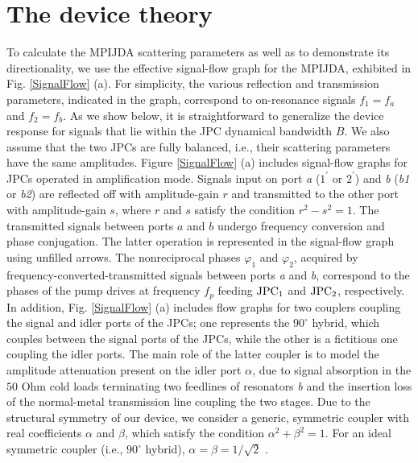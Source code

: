 \documentclass[aip,onecolumn,10pt]{revtex4}%
\begin{document}
\section{The device theory}
To calculate the MPIJDA scattering parameters as well as to demonstrate its directionality, we use the effective signal-flow graph for the MPIJDA, exhibited in Fig. \ref{SignalFlow} (a). For simplicity, the various reflection and transmission parameters, indicated in the graph, correspond to on-resonance signals $f_1=f_a$ and $f_2=f_b$. As we show below, it is straightforward to generalize the device response for signals that lie within the JPC dynamical bandwidth $B$. We also assume that the two JPCs are fully balanced, i.e., their scattering parameters have the same amplitudes. Figure \ref{SignalFlow} (a) includes signal-flow graphs for JPCs operated in amplification mode. Signals input on port \textit{a} ($1^{\prime}$ or $2^{\prime}$) and \textit{b} (\textit{b1} or \textit{b2}) are reflected off with amplitude-gain $r$ and transmitted to the other port with amplitude-gain $s$, where $r$ and $s$ satisfy the condition $r^2-s^2=1$. The transmitted signals between ports $a$ and $b$ undergo frequency conversion and phase conjugation. The latter operation is represented in the signal-flow graph using unfilled arrows. The nonreciprocal phases $\varphi_1$ and $\varphi_2$, acquired by frequency-converted-transmitted signals between ports \textit{a} and \textit{b}, correspond to the phases of the pump drives at frequency $f_p$ feeding $\rm{JPC_1}$ and $\rm{JPC_2}$, respectively.    
In addition, Fig. \ref{SignalFlow} (a) includes flow graphs for two couplers coupling the signal and idler ports of the JPCs; one represents the $90^{\circ}$ hybrid, which couples between the signal ports of the JPCs, while the other is a fictitious one coupling the idler ports. The main role of the latter coupler is to model the amplitude attenuation present on the idler port $\alpha$, due to signal absorption in the $50$ Ohm cold loads terminating two feedlines of resonators \textit{b} and the insertion loss of the normal-metal transmission line coupling the two stages. Due to the structural symmetry of our device, we consider a generic, symmetric coupler with real coefficients $\alpha$ and $\beta$, which satisfy the condition ${\alpha}^2+{\beta}^2=1$. For an ideal symmetric coupler (i.e., $90^{\circ}$ hybrid), $\alpha=\beta=1/\sqrt{2}$ \cite{Pozar}. 
\end{document}
